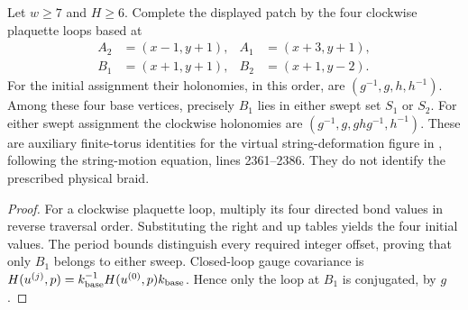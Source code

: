 \begin{lemma}%
    \label{thm:peps_torus_swept_string_endpoint_holonomy}
    \leanok
    Let $w\geq7$ and $H\geq6$. Complete the displayed patch by the
    four clockwise plaquette loops based at
    \begin{align}
        A_2 & =(x-1,y+1), & A_1 & =(x+3,y+1), \\
        B_1 & =(x+1,y+1), & B_2 & =(x+1,y-2).
    \end{align}
    For the initial assignment their holonomies, in this order,
    are $(g^{-1},g,h,h^{-1})$.
    Among these four base vertices, precisely $B_1$ lies in either
    swept set $S_1$ or $S_2$. For either swept assignment the
    clockwise holonomies are
    $(g^{-1},g,ghg^{-1},h^{-1})$.
    These are auxiliary finite-torus identities for the virtual
    string-deformation figure in \cite[Section~6.6]{Schuch2010PEPS},
    following the string-motion equation, lines 2361--2386.
    They do not identify the prescribed physical braid.
\end{lemma}

\begin{proof}\leanok
    For a clockwise plaquette loop, multiply its four directed
    bond values in reverse traversal order. Substituting the
    right and up tables yields the four initial values.
    The period bounds distinguish every required integer offset,
    proving that only $B_1$ belongs to either sweep.
    Closed-loop gauge covariance is
    $H(u^{(j)},p)=k_{\rm base}^{-1}H(u^{(0)},p)k_{\rm base}$.
    Hence only the loop at $B_1$ is conjugated, by $g$.
\end{proof}

